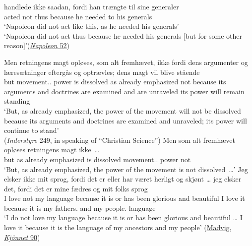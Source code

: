 \ea \label{ex:05-41}
\gll [Napoleon] handlede ikke saadan, fordi han trængte til sine generaler\\
[Napoleon] acted not thus because he needed to his generals\\
\glt `Napoleon did not act like this, as he needed his generals'\\
`Napoleon did not act thus because he needed his generals [but for some other reason]'\hfill(\href{https://archive.org/details/napoleonoggarib00brangoog/page/n33/mode/2up?q=%22handlede+ikke+saadan%22&view=theater}{\textit{Napoleon} 52}) %

\ex \label{ex:05-42}
\gll Men retningens magt opløses, som alt fremhævet, ikke fordi dens argumenter og læresætninger eftergås og optrævles; dens magt vil blive stående\\
 but movement.\DEF.\POSS{} power {is dissolved} as already emphasized not because its arguments and doctrines {are examined} and {are unraveled} its power will remain standing\\
\glt 
`But, as already emphasized, the power of the movement will not be dissolved because its arguments and doctrines are examined and unraveled; its power will continue to stand'\\\hfill(\textit{Inderstyre} 249, in speaking of ``Christian Science'') %
\ex \label{ex:05-43}
\gll Men som alt fremhævet opløses retningens magt ikke~{\dots}\\
 but as already emphasized {is dissolved} movement.\DEF.\POSS{} power not\\
\glt `But, as already emphasized, the power of the movement is not dissolved~{\dots}'
\ex \label{ex:05-44}
\gll Jeg elsker ikke mit sprog, fordi det er eller har været herligt og {skjønt {\dots}} jeg elsker det, fordi det er mine fædres og mit folks sprog\\
 I love not my language because it is or has been glorious and beautiful I love it because it is my fathers.\POSS{} and my people.\POSS{} language\\
\glt `I do not love my language because it is or has been glorious and beautiful {\dots} I love it because it is the language of my ancestors and my people'
\hfill(\href{https://books.google.com/books?id=XAJJAQAAMAAJ&pg=RA3-PA90&lpg=RA3-PA90&dq=madvig+%22Jeg+elsker+ikke+mit+sprog%22&source=bl&ots=rZlO8Lq4of&sig=ACfU3U0BK7Im87JxQP6To6D2Ey22Jl04eg&hl=en&sa=X&ved=2ahUKEwjCn5X5gZOFAxV4nK8BHWEgCx8Q6AF6BAgIEAM#v=onepage&q=madvig%20%22Jeg%20elsker%20ikke%20mit%20sprog%22&f=false}{Madvig, \textit{Kjönnet} 90})%
\z


